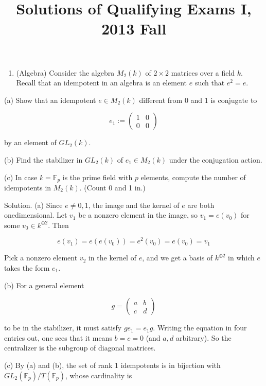 \documentclass[10pt]{article}
\title{Solutions of Qualifying Exams I, 2013 Fall }
\author{}
\date{}
\begin{document}
\maketitle
\begin{enumerate}
  \item (Algebra) Consider the algebra $M_{2}(k)$ of $2 \times 2$ matrices over a field $k$. Recall that an idempotent in an algebra is an element $e$ such that $e^{2}=e$.
\end{enumerate}

(a) Show that an idempotent $e \in M_{2}(k)$ different from 0 and 1 is conjugate to

$$
e_{1}:=\left(\begin{array}{cc}
1 & 0 \\
0 & 0
\end{array}\right)
$$

by an element of $G L_{2}(k)$.

(b) Find the stabilizer in $G L_{2}(k)$ of $e_{1} \in M_{2}(k)$ under the conjugation action.

(c) In case $k=\mathbb{F}_{p}$ is the prime field with $p$ elements, compute the number of idempotents in $M_{2}(k)$. (Count 0 and 1 in.)

Solution. (a) Since $e \neq 0,1$, the image and the kernel of $e$ are both onedimensional. Let $v_{1}$ be a nonzero element in the image, so $v_{1}=e\left(v_{0}\right)$ for some $v_{0} \in k^{\oplus 2}$. Then

$$
e\left(v_{1}\right)=e\left(e\left(v_{0}\right)\right)=e^{2}\left(v_{0}\right)=e\left(v_{0}\right)=v_{1}
$$

Pick a nonzero element $v_{2}$ in the kernel of $e$, and we get a basis of $k^{\oplus 2}$ in which $e$ takes the form $e_{1}$.

(b) For a general element

$$
g=\left(\begin{array}{ll}
a & b \\
c & d
\end{array}\right)
$$

to be in the stabilizer, it must satisfy $g e_{1}=e_{1} g$. Writing the equation in four entries out, one sees that it means $b=c=0$ (and $a, d$ arbitrary). So the centralizer is the subgroup of diagonal matrices.

(c) By (a) and (b), the set of rank 1 idempotents is in bijection with $G L_{2}\left(\mathbb{F}_{p}\right) / T\left(\mathbb{F}_{p}\right)$, whose cardinality is
\end{document}
